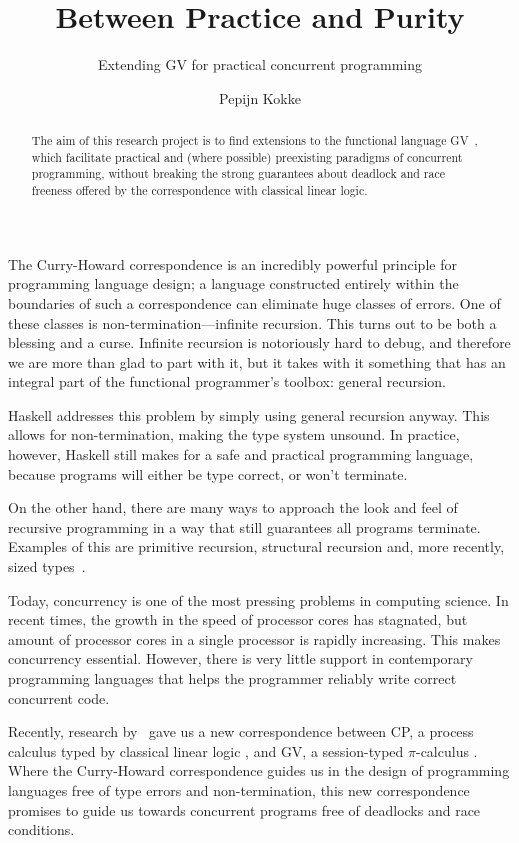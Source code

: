 \documentclass{scrartcl}
\title{Between Practice and Purity}
\subtitle{Extending GV for practical concurrent programming}
\author{Pepijn Kokke}
\begin{document}
\maketitle

\begin{abstract}
  The aim of this research project is to find extensions to the
  functional language GV~\citep{wadler2012}, which facilitate practical
  and (where possible) preexisting paradigms of concurrent
  programming, without breaking the strong guarantees about deadlock
  and race freeness offered by the correspondence with classical
  linear logic.
\end{abstract}

\vspace{5ex}

The Curry-Howard correspondence is an incredibly powerful principle
for programming language design; a language constructed entirely
within the boundaries of such a correspondence can eliminate huge
classes of errors.
One of these classes is non-termination---infinite recursion. This
turns out to be both a blessing and a curse. Infinite recursion is
notoriously hard to debug, and therefore we are more than glad to part
with it, but it takes with it something that has an integral part of
the functional programmer's toolbox: general recursion.

Haskell addresses this problem by simply using general recursion
anyway. This allows for non-termination, making the type system
unsound. In practice, however, Haskell still makes for a safe and
practical programming language, because programs will either be type
correct, or won't terminate.

On the other hand, there are many ways to approach the look and feel
of recursive programming in a way that still guarantees all programs
terminate. Examples of this are primitive recursion, structural
recursion and, more recently, sized types~\citep{lee2001}.

\vspace{5mm}

Today, concurrency is one of the most pressing problems in computing
science. In recent times, the growth in the speed of processor cores
has stagnated, but amount of processor cores in a single processor is
rapidly increasing. This makes concurrency essential. However, there
is very little support in contemporary programming languages that
helps the programmer reliably write correct concurrent code.

Recently, research by~\citet{wadler2012,caires2010,gay2009} gave us a
new correspondence between CP, a process calculus typed by classical
linear logic \citep{girard1987}, and GV, a session-typed $\pi$-calculus
\citep{honda1993,milner1992}.
Where the Curry-Howard correspondence guides us in the design of
programming languages free of type errors and non-termination, this
new correspondence promises to guide us towards concurrent programs
free of deadlocks and race conditions.
\end{document}
